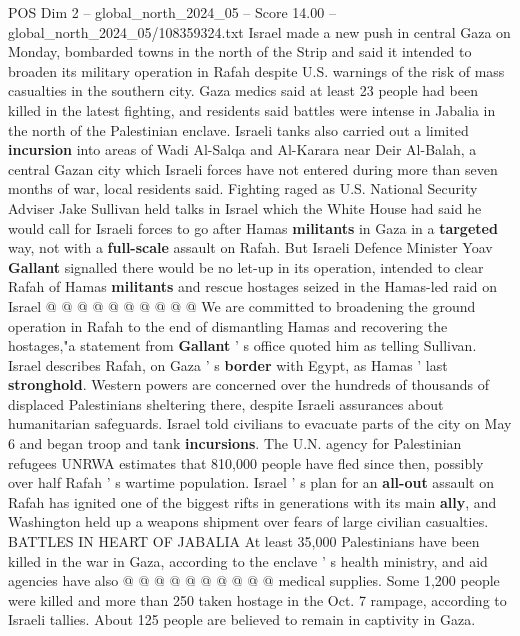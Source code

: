 \begin{textsample}{POS Dim 2 – global\_north\_2024\_05 – Score 14.00 – global\_north\_2024\_05/108359324.txt}  \label{ex:f2_pos_389}
Israel made a new push in central Gaza on Monday, bombarded towns in the north of the Strip and said it intended to broaden its military operation in Rafah despite U.S. warnings of the risk of mass casualties in the southern city.
Gaza medics said at least 23 people had been killed in the latest fighting, and residents said battles were intense in Jabalia in the north of the Palestinian enclave.
Israeli tanks also carried out a limited \textbf{incursion} into areas of Wadi Al-Salqa and Al-Karara near Deir Al-Balah, a central Gazan city which Israeli forces have not entered during more than seven months of war, local residents said.
Fighting raged as U.S.
National Security Adviser Jake Sullivan held talks in Israel which the White House had said he would call for Israeli forces to go after Hamas \textbf{militants} in Gaza in a \textbf{targeted} way, not with a \textbf{full-scale} assault on Rafah.
But Israeli Defence Minister Yoav \textbf{Gallant} signalled there would be no let-up in its operation, intended to clear Rafah of Hamas \textbf{militants} and rescue hostages seized in the Hamas-led raid on Israel @ @ @ @ @ @ @ @ @ @ We are committed to broadening the ground operation in Rafah to the end of dismantling Hamas and recovering the hostages,"a statement from \textbf{Gallant} ' s office quoted him as telling Sullivan.
Israel describes Rafah, on Gaza ' s \textbf{border} with Egypt, as Hamas ' last \textbf{stronghold}.
Western powers are concerned over the hundreds of thousands of displaced Palestinians sheltering there, despite Israeli assurances about humanitarian safeguards.
Israel told civilians to evacuate parts of the city on May 6 and began troop and tank \textbf{incursions}.
The U.N. agency for Palestinian refugees UNRWA estimates that 810,000 people have fled since then, possibly over half Rafah ' s wartime population.
Israel ' s plan for an \textbf{all-out} assault on Rafah has ignited one of the biggest rifts in generations with its main \textbf{ally}, and Washington held up a weapons shipment over fears of large civilian casualties.
BATTLES IN HEART OF JABALIA At least 35,000 Palestinians have been killed in the war in Gaza, according to the enclave ' s health ministry, and aid agencies have also @ @ @ @ @ @ @ @ @ @ medical supplies.
Some 1,200 people were killed and more than 250 taken hostage in the Oct. 7 rampage, according to Israeli tallies.
About 125 people are believed to remain in captivity in Gaza.

\end{textsample}

